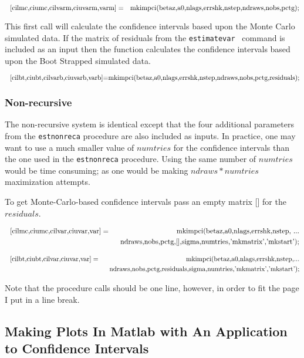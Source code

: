 \documentclass{article}
\begin{document}
\begin{equation*}
\text{\lbrack cilmc,ciumc,cilvarm,ciuvarm,varm]}=\text{%
mkimpci(betaz,a0,nlags,errshk,nstep,ndraws,nobs,pctg);}
\end{equation*}

This first call will calculate the confidence intervals based upon the Monte
Carlo simulated data. If the matrix of residuals from the \texttt{estimatevar%
} command is included as an input then the function calculates the
confidence intervals based upon the Boot Strapped simulated data.

\begin{equation*}
\text{\lbrack
cilbt,ciubt,cilvarb,ciuvarb,varb]=mkimpci(betaz,a0,nlags,errshk,nstep,ndraws,nobs,pctg,residuals);%
}
\end{equation*}

\subsubsection{Non-recursive}

The non-recursive system is identical except that the four additional
parameters from the \texttt{estnonreca} procedure are also included as
inputs. In practice, one may want to use a much smaller value of $numtries$
for the confidence intervals than the one used in the \texttt{estnonreca}
procedure. Using the same number of $numtries$ would be time consuming; as
one would be making $ndraws\ast numtries$ maximization attempts.

To get Monte-Carlo-based confidence intervals pass an empty matrix [] for
the $residuals$.

\begin{eqnarray*}
\text{\lbrack cilmc,ciumc,cilvar,ciuvar,var]} &=&\text{%
mkimpci(betaz,a0,nlags,errshk,nstep, ...} \\
&&\text{ndraws,nobs,pctg,[],sigma,numtries,'mkmatrix','mkstart');}
\end{eqnarray*}

\begin{eqnarray*}
\text{\lbrack cilbt,ciubt,cilvar,ciuvar,var]} &=&\text{%
mkimpci(betaz,a0,nlags,errshk,nstep,...} \\
&&\text{ndraws,nobs,pctg,residuals,sigma,numtries,'mkmatrix','mkstart');}
\end{eqnarray*}

Note that the procedure calls should be one line, however, in order to fit
the page I put in a line break.

\subsection{Making Plots In Matlab with An Application to Confidence
Intervals}
\end{document}
